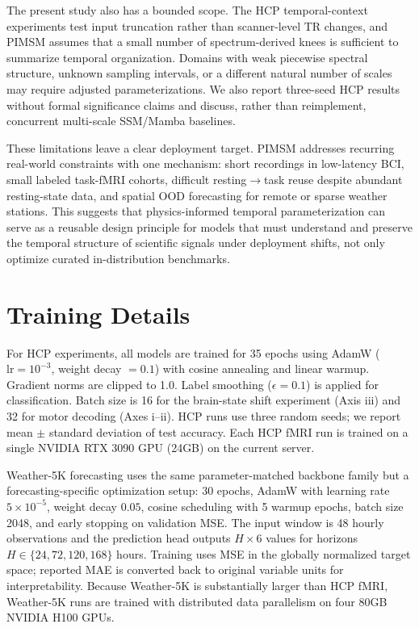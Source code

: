 \documentclass{article}
\begin{document}
The present study also has a bounded scope. The HCP temporal-context experiments test input truncation rather than scanner-level TR changes, and PIMSM assumes that a small number of spectrum-derived knees is sufficient to summarize temporal organization. Domains with weak piecewise spectral structure, unknown sampling intervals, or a different natural number of scales may require adjusted parameterizations. We also report three-seed HCP results without formal significance claims and discuss, rather than reimplement, concurrent multi-scale SSM/Mamba baselines.

These limitations leave a clear deployment target. PIMSM addresses recurring real-world constraints with one mechanism: short recordings in low-latency BCI, small labeled task-fMRI cohorts, difficult resting$\to$task reuse despite abundant resting-state data, and spatial OOD forecasting for remote or sparse weather stations. This suggests that physics-informed temporal parameterization can serve as a reusable design principle for models that must understand and preserve the temporal structure of scientific signals under deployment shifts, not only optimize curated in-distribution benchmarks.


\newpage
\appendix

\section{Training Details}
\label{sec:appx:training_details}

For HCP experiments, all models are trained for 35 epochs using AdamW ($\mathrm{lr} = 10^{-3}$, weight decay $= 0.1$) with cosine annealing and linear warmup. Gradient norms are clipped to 1.0. Label smoothing ($\epsilon = 0.1$) is applied for classification. Batch size is 16 for the brain-state shift experiment (Axis iii) and 32 for motor decoding (Axes i--ii). HCP runs use three random seeds; we report mean $\pm$ standard deviation of test accuracy. Each HCP fMRI run is trained on a single NVIDIA RTX 3090 GPU (24GB) on the current server.

Weather-5K forecasting uses the same parameter-matched backbone family but a forecasting-specific optimization setup: 30 epochs, AdamW with learning rate $5\times10^{-5}$, weight decay $0.05$, cosine scheduling with 5 warmup epochs, batch size 2048, and early stopping on validation MSE. The input window is 48 hourly observations and the prediction head outputs $H\times6$ values for horizons $H\in\{24,72,120,168\}$ hours. Training uses MSE in the globally normalized target space; reported MAE is converted back to original variable units for interpretability. Because Weather-5K is substantially larger than HCP fMRI, Weather-5K runs are trained with distributed data parallelism on four 80GB NVIDIA H100 GPUs.
\end{document}
